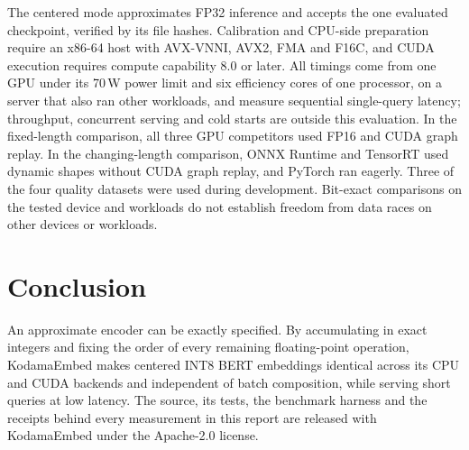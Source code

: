 \documentclass[10pt]{article}
\begin{document}
The centered mode approximates FP32 inference and accepts the one evaluated
checkpoint, verified by its file hashes. Calibration and CPU-side
preparation require an x86-64 host with AVX-VNNI, AVX2, FMA and F16C, and CUDA
execution requires compute capability 8.0 or later. All timings come from one
GPU under its 70\,W power limit and six efficiency cores of one processor, on
a server that also ran other workloads, and measure sequential single-query
latency; throughput, concurrent serving and cold starts are outside this
evaluation. In the fixed-length comparison, all three GPU competitors used
FP16 and CUDA graph replay. In the changing-length comparison, ONNX Runtime
and TensorRT used dynamic shapes without CUDA graph replay, and PyTorch ran
eagerly. Three of the four quality datasets were
used during development. Bit-exact comparisons on the tested device and
workloads do not establish freedom from data races on other devices or
workloads.

\section{Conclusion}

An approximate encoder can be exactly specified. By accumulating in
exact integers and fixing the order of every remaining floating-point
operation, KodamaEmbed makes centered INT8 BERT embeddings identical across its
CPU and CUDA backends and independent of batch composition, while serving
short queries at low latency. The source, its tests, the benchmark harness and
the receipts behind every measurement in this report are released with
KodamaEmbed under the Apache-2.0 license.
\end{document}
